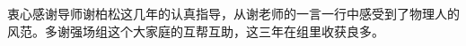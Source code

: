 
\begin{acknowledgements}
  衷心感谢导师谢柏松这几年的认真指导，从谢老师的一言一行中感受到了物理人的风范。多谢强场组这个大家庭的互帮互助，这三年在组里收获良多。
\end{acknowledgements}
